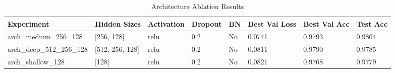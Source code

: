 \begin{table}[t]
    \centering
    \caption{Architecture Ablation Results}
    \label{tab:architecture_ablation}
    \begin{tabular}{llllllll}
        \toprule
        Experiment & Hidden Sizes & Activation & Dropout & BN & Best Val Loss & Best Val Acc & Test Acc \\
        \midrule
        arch_medium_256_128 & [256, 128] & relu & 0.2 & No & 0.0741 & 0.9793 & 0.9804 \\
        arch_deep_512_256_128 & [512, 256, 128] & relu & 0.2 & No & 0.0811 & 0.9790 & 0.9785 \\
        arch_shallow_128 & [128] & relu & 0.2 & No & 0.0821 & 0.9768 & 0.9779 \\
        \bottomrule
    \end{tabular}
\end{table}